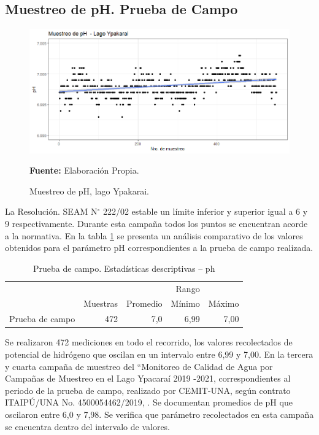 \subsection{Muestreo de pH. Prueba de Campo}

\begin{figure}[H]
        \centering
        \includegraphics[width=0.75\linewidth]{Imagenes/cap4/pHLago.png}
        \caption {Muestreo de pH, lago Ypakarai. }{\textbf{Fuente:}
        Elaboraci\'on Propia. }
        \label{fig:Lago_ph}
\end{figure}

La Resoluci\'on. SEAM N$ ^{\circ}$ 222/02 estable un l\'imite inferior y superior igual a 6 y 9 respectivamente. Durante esta campa\~na todos los puntos se encuentran acorde a la normativa.
En la tabla \ref{table:Lago_ph} se presenta un an\'alisis comparativo de los valores obtenidos para el par\'ametro pH correspondientes a la prueba de campo  realizada.

\begin{table}[H]
\centering
\caption{Prueba de campo. Estadísticas descriptivas – ph}
\label{table:Lago_ph}
\begin{tabular}{lrrrr}
\toprule & 
\multicolumn{3}{r}{Rango} \\ \cline{4-5} & 
Muestras & Promedio & Mínimo & Máximo \\
\midrule
Prueba de campo  &      472 &      7,0 &  6,99 &  7,00 \\
\bottomrule
\end{tabular}
\end{table}
Se realizaron 472 mediciones en todo el recorrido, los valores recolectados de potencial de hidr\'ogeno que oscilan en un intervalo entre 6,99 y 7,00.
En la tercera y cuarta campaña de muestreo del “Monitoreo de Calidad de Agua por Campañas de Muestreo en el Lago Ypacaraí 2019 -2021, correspondientes al periodo de la prueba de campo, realizado por CEMIT-UNA, seg\'un contrato ITAIPÚ/UNA No. 4500054462/2019, \cite{3er_Cemit}\cite{4to_Cemit}. Se documentan promedios de pH que oscilaron entre 6,0 y 7,98. 
Se verifica que par\'ametro recolectados en esta campa\~na se encuentra dentro del intervalo de valores.

